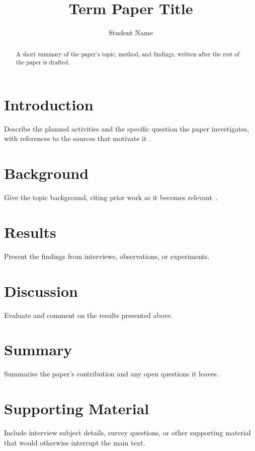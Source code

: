 \documentclass[journal]{IEEEtran}
\begin{document}
\title{Term Paper Title}
\author{Student Name}
\maketitle

\begin{abstract}
A short summary of the paper's topic, method, and findings, written
after the rest of the paper is drafted.
\end{abstract}

\section{Introduction}
Describe the planned activities and the specific question the paper
investigates, with references to the sources that motivate it
\cite{shannon1948}.

\section{Background}
Give the topic background, citing prior work as it becomes
relevant~\cite{turing1950}.

\section{Results}
Present the findings from interviews, observations, or experiments.

\section{Discussion}
Evaluate and comment on the results presented above.

\section{Summary}
Summarise the paper's contribution and any open questions it leaves.

\appendix
\section{Supporting Material}
Include interview subject details, survey questions, or other
supporting material that would otherwise interrupt the main text.



\end{document}
